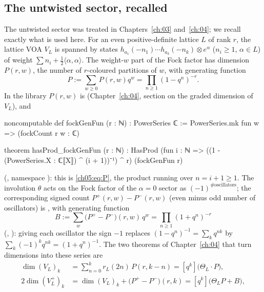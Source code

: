 \subsection{The untwisted sector, recalled}\label{ch05:sec:untwisted}

The untwisted sector was treated in Chapters~\ref{ch:03} and~\ref{ch:04}; we recall exactly what is
used here. For an even positive-definite lattice $L$ of rank $r$, the lattice VOA $V_L$ is spanned by
states $h_{a_1}(-n_1)\cdots h_{a_k}(-n_k)\otimes e^\alpha$ ($n_i\ge1$, $\alpha\in L$) of weight $\sum n_i +
\tfrac12\langle\alpha,\alpha\rangle$. The weight-$w$ part of the Fock factor has dimension $P(r,w)$,
the number of $r$-coloured partitions of $w$, with generating function
\begin{equation}\label{ch05:eq:P}
  P := \sum_{w\ge0}P(r,w)q^w = \prod_{n\ge1}(1-q^n)^{-r}.
\end{equation}
In the library $P(r,w)$ is  (Chapter~\ref{ch:04}, section on the graded dimension of $V_L$), and
\begin{leancode}
noncomputable def fockGenFun (r : ℕ) : PowerSeries ℂ := PowerSeries.mk fun w => (fockCount r w : ℂ)

theorem hasProd_fockGenFun (r : ℕ) :
    HasProd (fun i : ℕ => ((1 - (PowerSeries.X : ℂ⟦X⟧) ^ (i + 1))⁻¹) ^ r) (fockGenFun r)
\end{leancode}
(, namespace ): this is
\eqref{ch05:eq:P}, the product running over $n = i+1\ge1$. The involution $\theta$ acts on the Fock
factor of the $\alpha = 0$ sector as $(-1)^{\#\text{oscillators}}$; the corresponding signed count
$P^+(r,w) - P^-(r,w)$ (even minus odd number of oscillators) is , with
generating function
\begin{equation}\label{ch05:eq:B}
  B := \sum_w\bigl(P^+ - P^-\bigr)(r,w)\,q^w = \prod_{n\ge1}(1+q^n)^{-r}
\end{equation}
(, ): giving each oscillator the
sign $-1$ replaces $(1-q^n)^{-1} = \sum_k q^{nk}$ by $\sum_k(-1)^kq^{nk} = (1+q^n)^{-1}$. The two theorems
of Chapter~\ref{ch:04} that turn dimensions into these series are
\begin{align}
  \dim(V_L)_k &= \sum_{n=0}^k r_L(2n)\,P(r,k-n) = [q^k]\bigl(\Theta_L\cdot P\bigr),
    \label{ch05:eq:VL}\\
  2\dim(V_L^+)_k &= \dim(V_L)_k + \bigl(P^+-P^-\bigr)(r,k) = [q^k]\bigl(\Theta_L P + B\bigr),
    \label{ch05:eq:VLplus}
\end{align}
